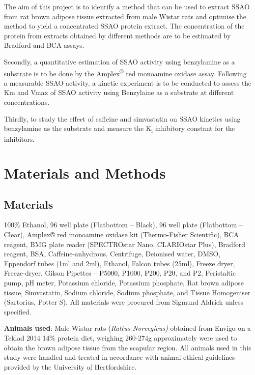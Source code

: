 \documentclass[
  letterpaper,
  DIV=11,
  numbers=noendperiod]{scrreprt}
\begin{document}
The aim of this project is to identify a method that can be used to
extract SSAO from rat brown adipose tissue extracted from male Wistar
rats and optimise the method to yield a concentrated SSAO protein
extract. The concentration of the protein from extracts obtained by
different methods are to be estimated by Bradford and BCA assays.

Secondly, a quantitative estimation of SSAO activity using benzylamine
as a substrate is to be done by the Amplex\textsuperscript{®} red
monoamine oxidase assay. Following a measurable SSAO activity, a kinetic
experiment is to be conducted to assess the Km and Vmax of SSAO activity
using Benzylaine as a substrate at different concentrations.

Thirdly, to study the effect of caffeine and simvastatin on SSAO
kinetics using benzylamine as the substrate and measure the
K\textsubscript{i} inhibitory constant for the inhibitors.


\chapter{Materials and Methods}\label{materials-and-methods}

\section{Materials}\label{materials}

100\% Ethanol, 96 well plate (Flatbottom -- Black), 96 well plate
(Flatbottom -- Clear), Amplex® red monoamine oxidase kit (Thermo-Fisher
Scientific), BCA reagent, BMG plate reader (SPECTROstar Nano, CLARIOstar
Plus), Bradford reagent, BSA, Caffeine-anhydrous, Centrifuge, Deionised
water, DMSO, Eppendorf tubes (1ml and 2ml), Ethanol, Falcon tubes
(25ml), Freeze dryer, Freeze-dryer, Gilson Pipettes -- P5000, P1000,
P200, P20, and P2, Peristaltic pump, pH meter, Potassium chloride,
Potassium phosphate, Rat brown adipose tissue, Simvastatin, Sodium
chloride, Sodium phosphate, and Tissue Homogeniser (Sartorius, Potter
S). All materials were procured from Sigmund Aldrich unless specified.

\textbf{Animals used}: Male Wistar rats (\emph{Rattus Norvegicus)}
obtained from Envigo on a Teklad 2014 14\% protein diet, weighing
260-274g approximately were used to obtain the brown adipose tissue from
the scapular region. All animals used in this study were handled and
treated in accordance with animal ethical guidelines provided by the
University of Hertfordshire.
\end{document}
